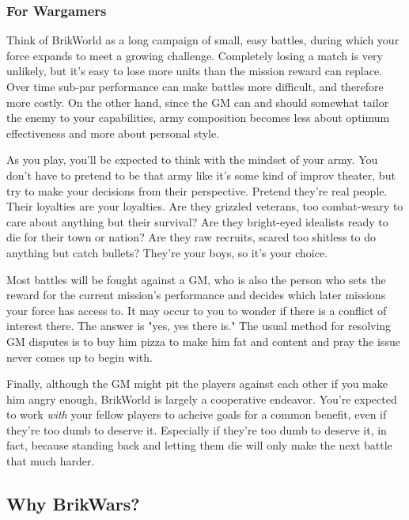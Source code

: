 \documentclass[12pt,a4paper,twocolumn]{article}
\begin{document}
\subsubsection{For Wargamers}
Think of BrikWorld as a long campaign of small, easy battles, during which your force expands to meet a growing challenge. Completely losing a match is very unlikely, but it's easy to lose more units than the mission reward can replace.  Over time sub-par performance can make battles more difficult, and therefore more costly.  On the other hand, since the GM can and should somewhat tailor the enemy to your capabilities, army composition becomes less about optimum effectiveness and more about personal style. 

As you play, you'll be expected to think with the mindset of your army.  You don't have to pretend to be that army like it's some kind of improv theater, but try to make your decisions from their perspective.  Pretend they're real people.  Their loyalties are your loyalties.  Are they grizzled veterans, too combat-weary to care about anything but their survival?   Are they bright-eyed idealists ready to die for their town or nation?  Are they raw recruits, scared too shitless to do anything but catch bullets?  They're your boys, so it's your choice.

Most battles will be fought against a GM, who is also the person who sets the reward for the current mission's performance and decides which later missions your force has access to.  It may occur to you to wonder if there is a conflict of interest there.  The answer is "yes, yes there is."  The usual method for resolving GM disputes is to buy him pizza to make him fat and content and pray the issue never comes up to begin with.

Finally, although the GM might pit the players against each other if you make him angry enough, BrikWorld is largely a cooperative endeavor.  You're expected to work {\em with} your fellow players to acheive goals for a common benefit, even if they're too dumb to deserve it.  Especially if they're too dumb to deserve it, in fact, because standing back and letting them die will only make the next battle that much harder.

\subsection{Why BrikWars?}
\end{document}
